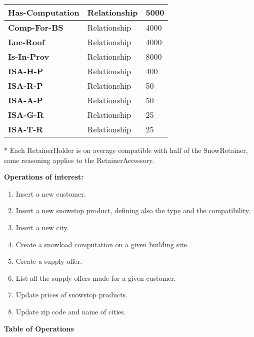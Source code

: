 \begin{table}[H]
\begin{tabular}{ | m{4.5cm} | m{4.5cm}| m{4.5cm} |}
    \hline
    \color[HTML]{3531FF} \textbf{Has-Computation} & Relationship & 5000\\
    \hline
    \color[HTML]{3531FF} \textbf{Comp-For-BS} & Relationship & 4000\\
    \hline
    \color[HTML]{3531FF} \textbf{Loc-Roof} & Relationship & 4000\\
    \hline
    \color[HTML]{3531FF} \textbf{Is-In-Prov} & Relationship & 8000 \\
    \hline
    \color[HTML]{3531FF} \textbf{ISA-H-P} & Relationship & 400 \\
    \hline
    \color[HTML]{3531FF} \textbf{ISA-R-P} & Relationship & 50 \\
    \hline
    \color[HTML]{3531FF} \textbf{ISA-A-P} & Relationship & 50 \\
    \hline
    \color[HTML]{3531FF} \textbf{ISA-G-R} & Relationship & 25 \\
    \hline
    \color[HTML]{3531FF} \textbf{ISA-T-R} & Relationship & 25 \\
    \hline
  \end{tabular}
\end{table}
\small{* Each RetainerHolder is on average compatible with half of the SnowRetainer, same reasoning applies to the RetainerAccessory.}

\pagebreak

\textbf{Operations of interest:}\label{TableOperations}
\begin{enumerate}
  \item Insert a new customer.
  \item Insert a new snowstop product, defining also the type and the compatibility.
  \item Insert a new city.
  \item Create a snowload computation on a given building site.
  \item Create a supply offer.
  \item List all the supply offers made for a given customer.
  \item Update prices of snowstop products.
  \item Update zip code and name of cities.
\end{enumerate}

\vspace{12px}

{\centering \textbf{Table of Operations}\\}

